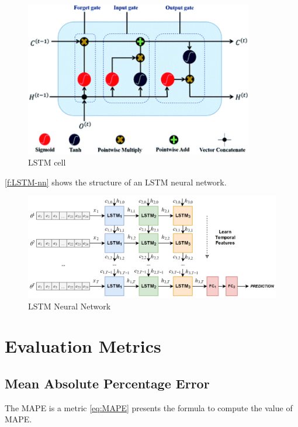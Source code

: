 \begin{figure}[h]
\centering
\includegraphics[width=10cm]{figures/Ch2/LSTM_cell.png}
\caption{LSTM cell \cite{Guo2020}}
\label{f:LSTM-cell}
\end{figure}

\autoref{f:LSTM-nn} shows the structure of an \ac{LSTM} neural network.

\begin{figure}[h]
\centering
\includegraphics[width=\linewidth]{figures/Ch2/LSTM_nn.png}
\caption{LSTM Neural Network \cite{zapata2019}}
\label{f:LSTM-nn}
\end{figure}



\section{Evaluation Metrics}
\label{sec:section_Example}

\subsection{Mean Absolute Percentage Error}
The \ac{MAPE} is a metric 
\autoref{eq:MAPE} presents the formula to compute the value of \ac{MAPE}.

